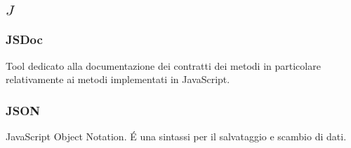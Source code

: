 \subsection*{\quad$J\quad$}
\subsubsection*{JSDoc}
Tool dedicato alla documentazione dei contratti dei metodi in particolare relativamente ai metodi implementati in JavaScript\glo.

\subsubsection*{JSON}
JavaScript Object Notation. \'E una sintassi per il salvataggio e scambio di dati.

